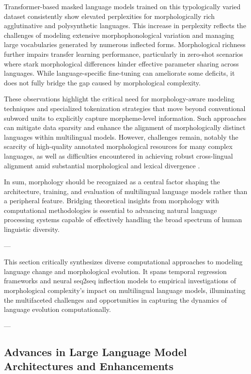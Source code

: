 \documentclass[sigconf]{acmart}
\begin{document}
Transformer-based masked language models trained on this typologically varied dataset consistently show elevated perplexities for morphologically rich agglutinative and polysynthetic languages. This increase in perplexity reflects the challenges of modeling extensive morphophonological variation and managing large vocabularies generated by numerous inflected forms. Morphological richness further impairs transfer learning performance, particularly in zero-shot scenarios where stark morphological differences hinder effective parameter sharing across languages. While language-specific fine-tuning can ameliorate some deficits, it does not fully bridge the gap caused by morphological complexity.

These observations highlight the critical need for morphology-aware modeling techniques and specialized tokenization strategies that move beyond conventional subword units to explicitly capture morpheme-level information. Such approaches can mitigate data sparsity and enhance the alignment of morphologically distinct languages within multilingual models. However, challenges remain, notably the scarcity of high-quality annotated morphological resources for many complex languages, as well as difficulties encountered in achieving robust cross-lingual alignment amid substantial morphological and lexical divergence \cite{ref34}.

In sum, morphology should be recognized as a central factor shaping the architecture, training, and evaluation of multilingual language models rather than a peripheral feature. Bridging theoretical insights from morphology with computational methodologies is essential to advancing natural language processing systems capable of effectively handling the broad spectrum of human linguistic diversity.

---

This section critically synthesizes diverse computational approaches to modeling language change and morphological evolution. It spans temporal regression frameworks and neural seq2seq inflection models to empirical investigations of morphological complexity’s impact on multilingual language models, illuminating the multifaceted challenges and opportunities in capturing the dynamics of language evolution computationally.

---

\subsection{Advances in Large Language Model Architectures and Enhancements}
\end{document}
